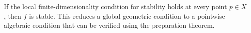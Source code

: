 If the local finite-dimensionality condition for stability holds at every point $p \in X$, then $f$ is stable. This reduces a global geometric condition to a pointwise algebraic condition that can be verified using the preparation theorem.
